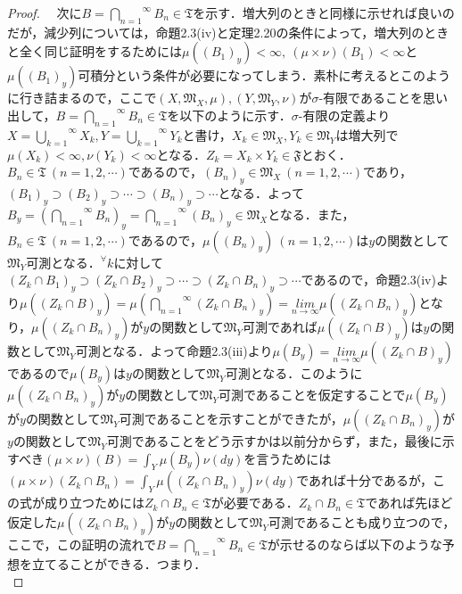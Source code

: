 \documentclass[a4paper,11pt]{jsarticle}
\newtheorem{proof}{証明}
\begin{document}
\begin{proof}
{\ }{\ }次に$B=\overset{\infty}{\underset{n=1}{\bigcap}}B_n\in\mathfrak{T}$を示す．増大列のときと同様に示せれば良いのだが，減少列については，命題2.3(iv)と定理2.20の条件によって，増大列のときと全く同じ証明をするためには$\mu((B_1)_y)<\infty,{\ }(\mu\times\nu)(B_1)<\infty$と$\mu((B_1)_y)$可積分という条件が必要になってしまう．素朴に考えるとこのように行き詰まるので，ここで$(X,\mathfrak{M}_X,\mu ),(Y,\mathfrak{M}_Y,\nu )$が$\sigma$-有限であることを思い出して，$B=\overset{\infty}{\underset{n=1}{\bigcap}}B_n\in\mathfrak{T}$を以下のように示す．$\sigma$-有限の定義より$X=\overset{\infty}{\underset{k=1}{\bigcup}}X_k,Y=\overset{\infty}{\underset{k=1}{\bigcup}}Y_k$と書け，$X_k\in\mathfrak{M}_X,Y_k\in\mathfrak{M}_Y$は増大列で$\mu(X_k)<\infty,\nu(Y_k)<\infty$となる．$Z_k=X_k\times Y_k \in \mathfrak{F}$とおく．$B_n\in\mathfrak{T}{\ }(n=1,2,\cdots)$であるので，$(B_n)_y\in \mathfrak{M}_X{\ }(n=1,2,\cdots)$であり，$(B_1)_y\supset (B_2)_y\supset \cdots\supset (B_n)_y\supset \cdots$となる．よって$B_y=\left(\overset{\infty}{\underset{n=1}{\bigcap}}B_n\right)_y=\overset{\infty}{\underset{n=1}{\bigcap}}(B_n)_y\in\mathfrak{M}_X$となる．また，$B_n\in\mathfrak{T}{\ }(n=1,2,\cdots)$であるので，$\mu((B_n)_y){\ }(n=1,2,\cdots)$は$y$の関数として$\mathfrak{M}_Y$可測となる．$^\forall k$に対して$(Z_k\cap B_1)_y\supset (Z_k\cap B_2)_y\supset \cdots\supset (Z_k\cap B_n)_y\supset \cdots$であるので，命題2.3(iv)より$\mu((Z_k\cap B)_y)=\mu(\overset{\infty}{\underset{n=1}{\bigcap}}(Z_k\cap B_n)_y)=\underset{n\to \infty}{lim}\mu((Z_k\cap B_n)_y)$となり，$\mu((Z_k\cap B_n)_y)$が$y$の関数として$\mathfrak{M}_Y$可測であれば$\mu((Z_k\cap B)_y)$は$y$の関数として$\mathfrak{M}_Y$可測となる．よって命題2.3(iii)より$\mu(B_y)=\underset{n\to \infty}{lim}\mu((Z_k\cap B)_y)$であるので$\mu(B_y)$は$y$の関数として$\mathfrak{M}_Y$可測となる．このように$\mu((Z_k\cap B_n)_y)$が$y$の関数として$\mathfrak{M}_Y$可測であることを仮定することで$\mu(B_y)$が$y$の関数として$\mathfrak{M}_Y$可測であることを示すことができたが，$\mu((Z_k\cap B_n)_y)$が$y$の関数として$\mathfrak{M}_Y$可測であることをどう示すかは以前分からず，また，最後に示すべき$(\mu\times\nu)(B)=\int_Y\mu(B_y)\nu(dy)$を言うためには$(\mu\times\nu)(Z_k\cap B_n)=\int_Y\mu((Z_k\cap B_n)_y)\nu(dy)$であれば十分であるが，この式が成り立つためには$Z_k\cap B_n\in \mathfrak{T}$が必要である．$Z_k\cap B_n\in \mathfrak{T}$であれば先ほど仮定した$\mu((Z_k\cap B_n)_y)$が$y$の関数として$\mathfrak{M}_Y$可測であることも成り立つので，ここで，この証明の流れで$B=\overset{\infty}{\underset{n=1}{\bigcap}}B_n\in\mathfrak{T}$が示せるのならば以下のような予想を立てることができる．つまり．
\begin{equation*}

\end{equation*}
\end{proof}
\end{document}
